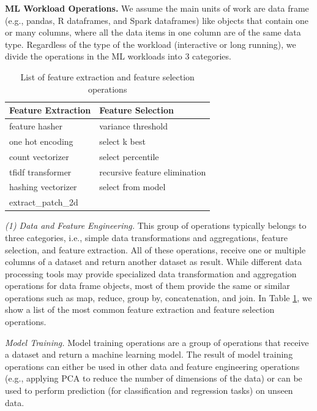 \textbf{ML Workload Operations.}
We assume the main units of work are data frame (e.g., pandas, R dataframes, and Spark dataframes) like objects that contain one or many columns, where all the data items in one column are of the same data type.
Regardless of the type of the workload (interactive or long running), we divide the operations in the ML workloads into 3 categories.
\begin{table}
\centering
\begin{tabular}{ll}
\hline
	   Feature Extraction & Feature Selection\\ \hline
        feature hasher & variance threshold  \\
        one hot encoding & select k best \\
        count vectorizer& select percentile \\ 
        tfidf transformer & recursive feature elimination \\
        hashing vectorizer & select from model \\
        extract\_patch\_2d &  \\
        \hline
\end{tabular}
\caption{List of feature extraction and feature selection operations}\label{feature-engineering-operations}
\end{table}

\textit{(1) Data and Feature Engineering.}
This group of operations typically belongs to three categories, i.e., simple data transformations and aggregations, feature selection, and feature extraction.
All of these operations, receive one or multiple columns of a dataset and return another dataset as result. 
While different data processing tools may provide specialized data transformation and aggregation operations for data frame objects, most of them provide the same or similar operations such as map, reduce, group by, concatenation, and join. 
In Table \ref{feature-engineering-operations}, we show a list of the most common feature extraction and feature selection operations.

\textit{Model Training.}
Model training operations are a group of operations that receive a dataset and return a machine learning model.
The result of model training operations can either be used in other data and feature engineering operations (e.g., applying PCA to reduce the number of dimensions of the data) or can be used to perform prediction (for classification and regression tasks) on unseen data.

